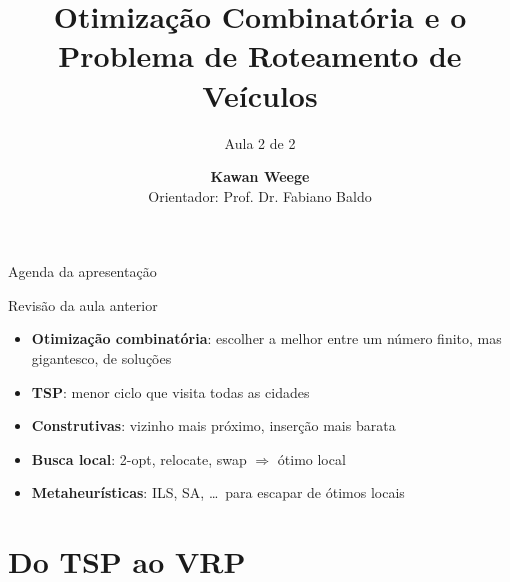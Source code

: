 \documentclass[aspectratio=169,xcolor=table]{beamer}
\title[Problema de Roteamento de Veículos]{Otimização Combinatória e o\\Problema de Roteamento de Veículos}
\subtitle{Aula 2 de 2}
\author[Kawan Weege]{\textbf{Kawan Weege}\\{\small Orientador: Prof. Dr. Fabiano Baldo}}
\begin{document}
\begin{frame}
  \titlepage
\end{frame}

\begin{frame}{Agenda da apresentação}
  \tableofcontents
\end{frame}

\begin{frame}{Revisão da aula anterior}
  \begin{itemize}
    \item \textbf{Otimização combinatória}: escolher a melhor entre um número finito, mas gigantesco, de soluções
    \item \textbf{TSP}: menor ciclo que visita todas as cidades
    \item \textbf{Construtivas}: vizinho mais próximo, inserção mais barata
    \item \textbf{Busca local}: 2-opt, relocate, swap $\Rightarrow$ ótimo local
    \item \textbf{Metaheurísticas}: ILS, SA, \dots\ para escapar de ótimos locais
  \end{itemize}
\end{frame}

\section{Do TSP ao VRP}
\end{document}
